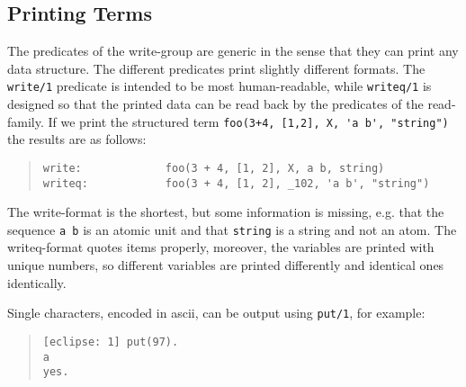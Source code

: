\subsection{Printing {\eclipse} Terms}
The predicates of the write-group are generic in the sense that they
can print any {\eclipse} data structure.
The different predicates print slightly different formats.
The {\tt write/1} predicate is intended to be most human-readable, 
while {\tt writeq/1} is designed so that the
printed data can be read back by the predicates of the read-family.
If we print the structured term \verb.foo(3+4, [1,2], X, 'a b', "string").
the results are as follows:
\begin{quote}\begin{verbatim}
write:             foo(3 + 4, [1, 2], X, a b, string)
writeq:            foo(3 + 4, [1, 2], _102, 'a b', "string")
\end{verbatim}\end{quote}
The write-format is the shortest, but some information is missing,
e.g. that the sequence \verb.a b. is an atomic unit and that \verb.string.
is a string and not an atom. The writeq-format quotes items properly,
moreover, the variables are printed with unique numbers, so different
variables are printed differently and identical ones identically.

Single characters, encoded in ascii, can be output using {\tt put/1},
for example: 
\begin{quote}\begin{verbatim} 
[eclipse: 1] put(97).
a
yes.
\end{verbatim}\end{quote}


